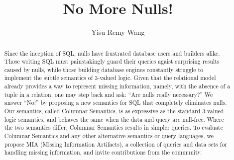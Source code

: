 \documentclass[sigconf]{acmart}
\begin{document}
\title{No More Nulls!}
\author{Yisu Remy Wang}

\begin{abstract}
Since the inception of SQL, 
 nulls have frustrated database users and builders alike.
Those writing SQL must painstakingly
 guard their queries agaist surprising results caused by nulls,
 while those building database engines
 constantly struggle to implement the subtle semantics of 3-valued logic.
Given that the relational model already provides a way 
 to represent missing information,
 namely, with the absence of a tuple in a relation,
 one may step back and ask: ``Are nulls really necessary?''
We answer ``No!'' by proposing a new semantics for SQL
 that completely eliminates nulls.
Our semantics, called Columnar Semantics, 
 is as expressive as the standard 3-valued logic semantics,
 and behaves the same when the data and query are null-free.
Where the two semantics differ, Columnar Semantics results in simpler queries.
To evaluate Columnar Semantics and any other alternative semantics 
 or query languages, 
 we propose MIA (Missing Information Artifacts),
 a collection of queries and data sets for handling missing information,
 and invite contributions from the community.
\end{abstract}

\maketitle
\end{document}
